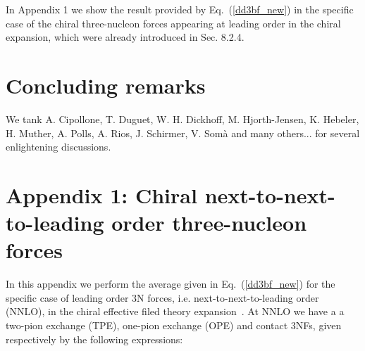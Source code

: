 In Appendix 1 we show the result provided by Eq.~(\ref{dd3bf_new}) in the specific case of the chiral three-nucleon forces appearing at leading order in the chiral expansion, which were already introduced in Sec. 8.2.4.

\section{Concluding remarks}


\begin{acknowledgement}
We tank A. Cipollone, T. Duguet, W. H. Dickhoff, M. Hjorth-Jensen, K. Hebeler, H. Muther, A. Polls, A. Rios, J. Schirmer, V. Som\`a and many others...   for several enlightening discussions. 
\end{acknowledgement}
%
\section*{Appendix 1: Chiral next-to-next-to-leading order three-nucleon forces}
\label{app:scgf_3NF}

In this appendix we perform the average given in Eq.~(\ref{dd3bf_new}) for the specific case of leading order 3N forces, i.e. next-to-next-to-leading order (NNLO), in the chiral effective filed theory expansion~\cite{vKol1994,Epelbaum2002Dec2}. At NNLO we have a a two-pion exchange (TPE), one-pion exchange (OPE) and contact 3NFs, given respectively by the following expressions:

